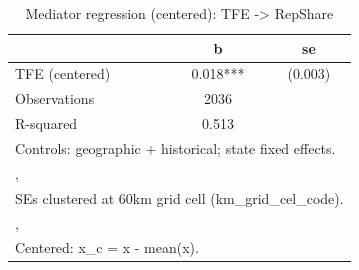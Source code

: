 \begin{table}[htbp]\centering
\def\sym#1{\ifmmode^{#1}\else\(^{#1}\)\fi}
\caption{Mediator regression (centered): TFE -> RepShare}
\begin{tabular}{l*{1}{cc}}
\toprule
                &        b   &       se\\
\midrule
TFE (centered)  &    0.018***&  (0.003)\\
\midrule
Observations    &     2036   &         \\
R-squared       &    0.513   &         \\
\bottomrule
\multicolumn{3}{l}{\footnotesize Controls: geographic + historical; state fixed effects.}\\
\multicolumn{3}{l}{\footnotesize ,}\\
\multicolumn{3}{l}{\footnotesize SEs clustered at 60km grid cell (km\_grid\_cel\_code).}\\
\multicolumn{3}{l}{\footnotesize ,}\\
\multicolumn{3}{l}{\footnotesize Centered: x\_c = x - mean(x).}\\
\end{tabular}
\end{table}
